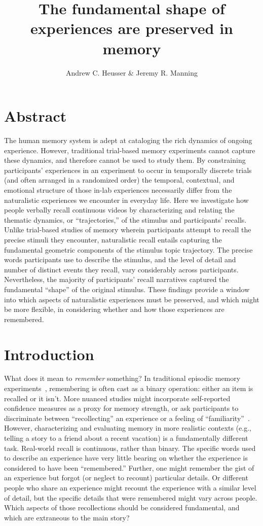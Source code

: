 \documentclass{article}
\title{The fundamental shape of experiences are preserved in memory}
\author{Andrew C. Heusser \& Jeremy R. Manning}
\begin{document}
\maketitle

\section{Abstract}
{
The human memory system is adept at cataloging the rich dynamics of ongoing experience. However, traditional trial-based memory experiments cannot capture these dynamics, and therefore cannot be used to study them.  By constraining participants' experiences in an experiment to occur in temporally discrete trials (and often arranged in a randomized order) the temporal, contextual, and emotional structure of those in-lab experiences necessarily differ from the naturalistic experiences we encounter in everyday life.  Here we investigate how people verbally recall continuous videos by characterizing and relating the thematic dynamics, or ``trajectories,'' of the stimulus and participants' recalls.  Unlike trial-based studies of memory wherein participants attempt to recall the precise stimuli they encounter, naturalistic recall entails capturing the fundamental geometric components of the stimulus topic trajectory.  The precise words participants use to describe the stimulus, and the level of detail and number of distinct events they recall, vary considerably across participants.  Nevertheless, the majority of participants' recall narratives captured the fundamental ``shape'' of the original stimulus.  These findings provide a window into which aspects of naturalistic experiences must be preserved, and which might be more flexible, in considering whether and how those experiences are remembered.

\section{Introduction}

What does it mean to \textit{remember} something? In traditional episodic memory experiments~\citep[e.g., list-learning or trial-based experiments;][]{Murd62a, Kaha96}, remembering is often cast as a binary operation: either an item is recalled or it isn't. More nuanced studies might incorporate self-reported confidence measures as a proxy for memory strength, or ask participants to discriminate between ``recollecting'' an experience or a feeling of ``familiarity''~\citep{Yone02}. However, characterizing and evaluating memory in more realistic contexts (e.g., telling a story to a friend about a recent vacation) is a fundamentally different task. Real-world recall is continuous, rather than binary.  The specific words used to describe an experience have very little bearing on whether the experience is considered to have been ``remembered.''  Further, one might remember the gist of an experience but forgot (or neglect to recount) particular details.  Or different people who share an experience might recount the experience with a similar level of detail, but the specific details that were remembered might vary across people.  Which aspects of those recollections should be considered fundamental, and which are extraneous to the main story?

}
\end{document}
